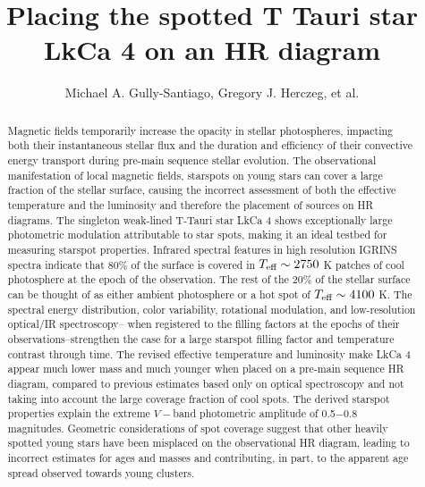 \documentclass[twocolumn]{emulateapj}%
\begin{document}
 
\title{Placing the spotted T Tauri star LkCa 4 on an HR diagram}

\author{Michael A. Gully-Santiago, Gregory J. Herczeg, et al.}



\begin{abstract}
Magnetic fields temporarily increase the opacity in stellar photospheres, impacting both their instantaneous stellar flux and the duration and efficiency of their convective energy transport during pre-main sequence stellar evolution.  The observational manifestation of local magnetic fields, starspots on young stars can cover a large fraction of the stellar surface, causing the incorrect assessment of both the effective temperature and the luminosity and therefore the placement of sources on HR diagrams.  The singleton weak-lined T-Tauri star LkCa 4 shows exceptionally large photometric modulation attributable to star spots, making it an ideal testbed for measuring starspot properties.  Infrared spectral features in high resolution IGRINS spectra indicate that 80\% of the surface is covered in $T_\textrm{eff} \sim 2750$ K patches of cool photosphere at the epoch of the observation.  The rest of the $20\%$ of the stellar surface can be thought of as either ambient photosphere or a hot spot of $T_\textrm{eff}\sim4100$ K.  The spectral energy distribution, color variability, rotational modulation, and low-resolution optical/IR spectroscopy-- when registered to the filling factors at the epochs of their observations--strengthen the case for a large starspot filling factor and temperature contrast through time.  The revised effective temperature and luminosity make LkCa 4 appear much lower mass and much younger when placed on a pre-main sequence HR diagram, compared to previous estimates based only on optical spectroscopy and not taking into account the large coverage fraction of cool spots.  The derived starspot properties explain the extreme $V-$band photometric amplitude of 0.5$-$0.8 magnitudes.  Geometric considerations of spot coverage suggest that other heavily spotted young stars have been misplaced on the observational HR diagram, leading to incorrect estimates for ages and masses and contributing, in part, to the apparent age spread observed towards young clusters.
\end{abstract}

\end{document}
